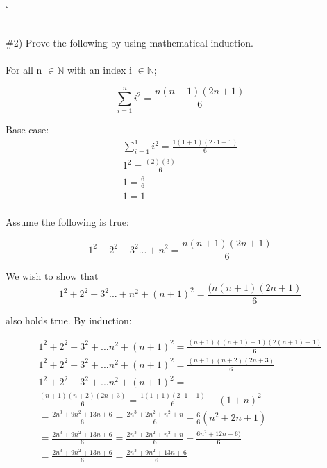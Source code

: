 \documentclass[11pt]{article}
\begin{document}
$\square$

\section{}

\#2) Prove the following by using mathematical induction.

\paragraph{}

For all n $\in \mathbb{N}$ with an index i $\in\mathbb{N}$;

\begin{equation}
	\sum_{i=1}^{n}i^2=\frac{n(n+1)(2n+1)}{6}
\end{equation}

Base case:
\begin{equation}
	\begin{gathered}
		\sum_{i=1}^{1}i^2=\frac{1(1+1)(2\cdot1+1)}{6} \\
		1^2=\frac{(2)(3)}{6} \\
		1 = \frac{6}{6} \\
		1 = 1 \\
	\end{gathered}
\end{equation}

Assume the following is true:

\begin{equation}
	1^2+2^2+3^2...+{n}^2=\frac{n(n+1)(2n+1)}{6}
\end{equation}

We wish to show that
\begin{equation}
	1^2+2^2+3^2...+{n}^2+(n+1)^2=\frac{(n(n+1)(2n+1)}{6}
\end{equation}

also holds true. By induction:

\begin{equation}
	\begin{gathered}
		1^2+2^2+3^2+...n^2+(n+1)^2=\frac{(n+1)((n+1)+1)(2(n+1)+1)}{6} \\
		1^2+2^2+3^2+...n^2+(n+1)^2=\frac{(n+1)(n+2)(2n+3)}{6} \\
		1^2+2^2+3^2+...n^2+(n+1)^2= \\
		\frac{(n+1)(n+2)(2n+3)}{6} = \frac{1(1+1)(2\cdot1+1)}{6} + (1+n)^2 \\
		=\frac{2n^3+9n^2+13n+6}{6} = \frac{2n^3+2n^2+n^2+n}{6} + \frac{6}{6}(n^2+2n+1) \\
		=\frac{2n^3+9n^2+13n+6}{6} = \frac{2n^3+2n^2+n^2+n}{6} + \frac{6n^2+12n+6)}{6} \\
		=\frac{2n^3+9n^2+13n+6}{6} = \frac{2n^3+9n^2+13n+6}{6} \\
	\end{gathered}
\end{equation}
\end{document}
